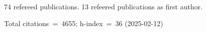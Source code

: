 74 refereed publications. 13 refeered publications as first author.

Total citations~=~4655; h-index~=~36 (2025-02-12)